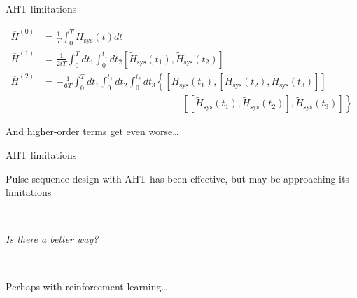 \documentclass{beamer}
\begin{document}
\begin{frame}{AHT limitations}

{\scriptsize %
\begin{align*}
    \overline{H}^{(0)} &= \frac{1}{T} \int_0^{T}
        \widetilde{H}_{\text{sys}}(t) dt \\
    \overline{H}^{(1)} &= \frac{1}{2iT} \int_0^{T} dt_1 \int_0^{t_1} dt_2
        \left[\widetilde{H}_{\text{sys}}(t_1), \widetilde{H}_{\text{sys}}(t_2)\right] \\
    \overline{H}^{(2)} &= -\frac{1}{6T}
    \int_0^{T} dt_1 \int_0^{t_1} dt_2 \int_0^{t_2} dt_3
    \left\{
    \left[\widetilde{H}_{\text{sys}}(t_1), \left[\widetilde{H}_{\text{sys}}(t_2), \widetilde{H}_{\text{sys}}(t_3)\right]\right] \right. \\
    & \hspace{13em} + \left.
    \left[\left[\widetilde{H}_{\text{sys}}(t_1), \widetilde{H}_{\text{sys}}(t_2)\right], \widetilde{H}_{\text{sys}}(t_3)\right]
    \right\}
\end{align*}
}

And higher-order terms get even worse\dots

%


\end{frame}


\begin{frame}{AHT limitations}

Pulse sequence design with AHT has been effective, but may be approaching its limitations

~\\

\pause

\emph{Is there a better way?}

~\\

\pause

Perhaps with reinforcement learning\dots

\end{frame}
\end{document}
